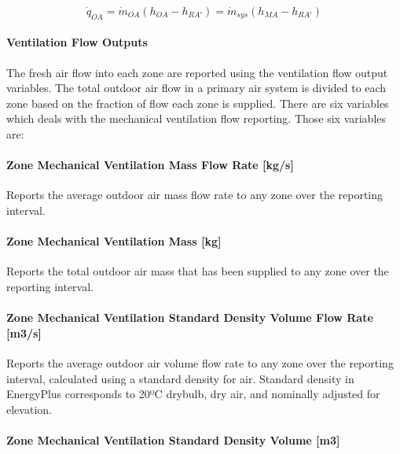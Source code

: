 \begin{equation}
{\dot q_{OA}} = {\dot m_{OA}}\left( {{h_{OA}} - {h_{RA'}}} \right) = {\dot m_{sys}}\left( {{h_{MA}} - {h_{RA'}}} \right)
\end{equation}

\paragraph{Ventilation Flow Outputs}\label{ventilation-flow-outputs}

The fresh air flow into each zone are reported using the ventilation flow output variables. The total outdoor air flow in a primary air system is divided to each zone based on the fraction of flow each zone is supplied. There are six variables which deals with the mechanical ventilation flow reporting. Those six variables are:

\paragraph{Zone Mechanical Ventilation Mass Flow Rate {[}kg/s{]}}\label{zone-mechanical-ventilation-mass-flow-rate-kgs}

Reports the average outdoor air mass flow rate to any zone over the reporting interval.

\paragraph{Zone Mechanical Ventilation Mass {[}kg{]}}\label{zone-mechanical-ventilation-mass-kg}

Reports the total outdoor air mass that has been supplied to any zone over the reporting interval.

\paragraph{Zone Mechanical Ventilation Standard Density Volume Flow Rate {[}m3/s{]}}\label{zone-mechanical-ventilation-standard-density-volume-flow-rate-m3s}

Reports the average outdoor air volume flow rate to any zone over the reporting interval, calculated using a standard density for air. Standard density in EnergyPlus corresponds to 20ºC drybulb, dry air, and nominally adjusted for elevation.

\paragraph{Zone Mechanical Ventilation Standard Density Volume {[}m3{]}}\label{zone-mechanical-ventilation-standard-density-volume-m3}

